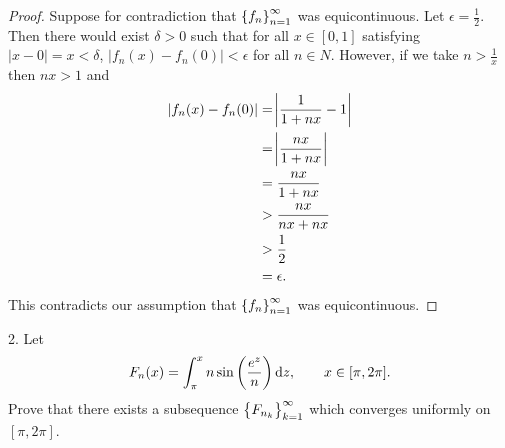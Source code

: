 \documentclass{article}
\begin{document}
\begin{proof}

Suppose for contradiction that $\cbr{f_n}_{n = 1}^\infty$ was
equicontinuous. Let $\epsilon = \frac{1}{2}$. Then there would exist
$\delta > 0$ such that for all $x \in [0, 1]$ satisfying $|x - 0| = x <
\delta$, $|f_n(x) - f_n(0)| < \epsilon$ for all $n \in N$. However,
if we take $n > \frac{1}{x}$ then $n x > 1$ and
%
\begin{align*}
    |f_n(x) - f_n(0)|
        &= \envert{\frac{1}{1 + n x} - 1} \\
        &= \envert{\frac{n x}{1 + n x}} \\
        &= \frac{n x}{1 + n x} \\
        &> \frac{n x}{n x + n x} \\
        &> \frac{1}{2} \\
        &= \epsilon
        .
\end{align*}
%
This contradicts our assumption that $\cbr{f_n}_{n = 1}^\infty$ was
equicontinuous.

\end{proof}

\newpage

2. Let
%
\begin{equation*}
    F_n(x) = \int_\pi^x n \sin \del{\frac{e^z}{n}} \dif z,
    \qquad
    x \in [\pi, 2 \pi]
    .
\end{equation*}
%
Prove that there exists a subsequence $\cbr{F_{n_k}}_{k = 1}^\infty$
which converges uniformly on $[\pi, 2 \pi]$.
\end{document}
